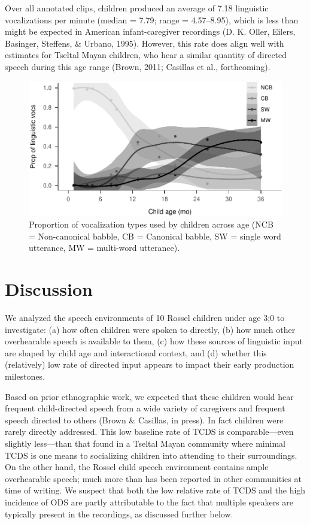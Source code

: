 \documentclass[,man,floatsintext]{apa6}
\begin{document}
Over all annotated clips, children produced an average of 7.18
linguistic vocalizations per minute (median = 7.79; range = 4.57--8.95),
which is less than might be expected in American infant-caregiver
recordings (D. K. Oller, Eilers, Basinger, Steffens, \& Urbano, 1995).
However, this rate does align well with estimates for Tseltal Mayan
children, who hear a similar quantity of directed speech during this age
range (Brown, 2011; Casillas et al., forthcoming).

\begin{figure}
\centering
\includegraphics{Yeli-CLE_files/figure-latex/fig4-1.pdf}
\caption{\label{fig:fig4}Proportion of vocalization types used by children
across age (NCB = Non-canonical babble, CB = Canonical babble, SW =
single word utterance, MW = multi-word utterance).}
\end{figure}

\section{Discussion}\label{disc}

We analyzed the speech environments of 10 Rossel children under age 3;0
to investigate: (a) how often children were spoken to directly, (b) how
much other overhearable speech is available to them, (c) how these
sources of linguistic input are shaped by child age and interactional
context, and (d) whether this (relatively) low rate of directed input
appears to impact their early production milestones.

Based on prior ethnographic work, we expected that these children would
hear frequent child-directed speech from a wide variety of caregivers
and frequent speech directed to others (Brown \& Casillas, in press). In
fact children were rarely directly addressed. This low baseline rate of
TCDS is comparable---even slightly less---than that found in a Tseltal
Mayan community where minimal TCDS is one means to socializing children
into attending to their surroundings. On the other hand, the Rossel
child speech environment contains ample overhearable speech; much more
than has been reported in other communities at time of writing. We
suspect that both the low relative rate of TCDS and the high incidence
of ODS are partly attributable to the fact that multiple speakers are
typically present in the recordings, as discussed further below.
\end{document}
